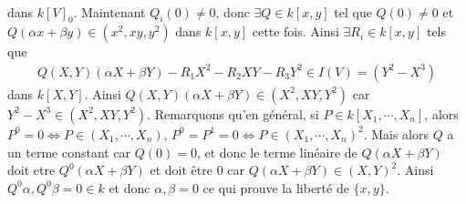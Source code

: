 \begin{expl}
\begin{align*}
                \end{align*}
                dans $k[V]_0$. Maintenant $Q_i(0) \ne 0$, donc $\exists Q \in k[x,y]$ tel que $Q(0) \neq 0$ et $Q(\alpha x + \beta y) \in (x^2, xy, y^2)$ dans $k[x,y]$ cette fois. Ainsi $\exists R_i \in k[x,y]$ tels que 
                \begin{align*}
                    Q(X,Y)(\alpha X + \beta Y) - R_1X^2 - R_2XY - R_3Y^2 \in I(V) = (Y^2 - X^3)
                \end{align*}
                dans $k[X,Y]$. Ainsi $Q(X,Y)(\alpha X + \beta Y) \in (X^2, XY, Y^2)$ car $Y^2 - X^3 \in (X^2, XY, Y^2)$. Remarquons qu'en général, si $P \in k[X_1, \cdots, X_n]$, alors $P^0 = 0 \iff P \in (X_1, \cdots, X_n)$, $P^0 = P^1 = 0 \iff P \in (X_1, \cdots, X_n)^2$. Mais alors $Q$ a un terme constant car $Q(0) = 0$, et donc le terme linéaire de $Q(\alpha X + \beta Y)$ doit etre $Q^0(\alpha X + \beta Y)$ et doit être $0$ car $Q(\alpha X + \beta Y) \in (X,Y)^2$. Ainsi $Q^0\alpha, Q^0 \beta = 0 \in k$ et donc $\alpha, \beta = 0$ ce qui prouve la liberté de $\{x,y\}$.
            \end{expl}

